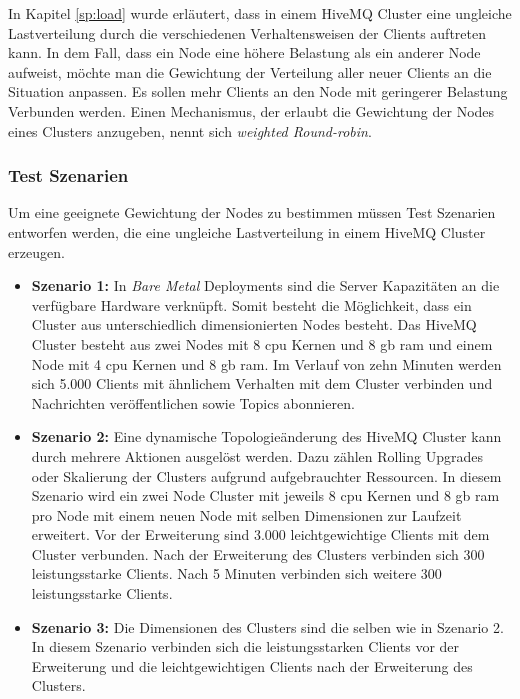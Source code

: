 In Kapitel \ref{sp:load} wurde erläutert, dass in einem HiveMQ Cluster eine ungleiche Lastverteilung durch die verschiedenen Verhaltensweisen der Clients auftreten kann.
In dem Fall, dass ein Node eine höhere Belastung als ein anderer Node aufweist, möchte man die Gewichtung der Verteilung aller neuer Clients an die Situation anpassen. Es sollen mehr Clients an den Node mit geringerer Belastung Verbunden werden.
Einen Mechanismus, der erlaubt die Gewichtung der Nodes eines Clusters anzugeben, nennt sich \textit{weighted Round-robin}.

\subsubsection{Test Szenarien} \label{ss:test}
Um eine geeignete Gewichtung der Nodes zu bestimmen müssen Test Szenarien entworfen werden, die eine ungleiche Lastverteilung in einem HiveMQ Cluster erzeugen.

\begin{itemize}
  \item \textbf{Szenario 1:} In \textit{Bare Metal} Deployments sind die Server Kapazitäten an die verfügbare Hardware verknüpft. Somit besteht die Möglichkeit, dass ein Cluster aus unterschiedlich dimensionierten Nodes besteht. Das HiveMQ Cluster besteht aus zwei Nodes mit 8 \ac{cpu} Kernen und 8 \ac{gb} \ac{ram} und einem Node mit 4 \ac{cpu} Kernen und 8 \ac{gb} \ac{ram}. Im Verlauf von zehn Minuten werden sich 5.000 Clients mit ähnlichem Verhalten mit dem Cluster verbinden und Nachrichten veröffentlichen sowie Topics abonnieren.
  \item \textbf{Szenario 2:} Eine dynamische Topologieänderung des HiveMQ Cluster kann durch mehrere Aktionen ausgelöst werden. Dazu zählen Rolling Upgrades oder Skalierung der Clusters aufgrund aufgebrauchter Ressourcen. In diesem Szenario wird ein zwei Node Cluster mit jeweils 8 \ac{cpu} Kernen und 8 \ac{gb} \ac{ram} pro Node mit einem neuen Node mit selben Dimensionen zur Laufzeit erweitert. Vor der Erweiterung sind 3.000 leichtgewichtige Clients mit dem Cluster verbunden. Nach der Erweiterung des Clusters verbinden sich 300 leistungsstarke Clients. Nach 5 Minuten verbinden sich weitere 300 leistungsstarke Clients.
  \item \textbf{Szenario 3:} Die Dimensionen des Clusters sind die selben wie in Szenario 2. In diesem Szenario verbinden sich die leistungsstarken Clients vor der Erweiterung und die leichtgewichtigen Clients nach der Erweiterung des Clusters.
\end{itemize}

